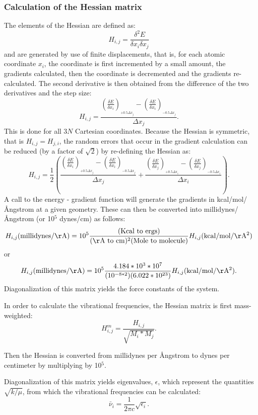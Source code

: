 \subsubsection*{Calculation of the Hessian matrix}
The elements of the Hessian are defined as:
$$
H_{i,j} = \frac{\delta^2E}{\delta x_i\delta x_j}
$$
and  are generated by use of finite displacements, that is, for each  atomic
coordinate $x_i$, the coordinate is first incremented by a small amount, the
gradients  calculated, then the coordinate is decremented and the gradients
re-calculated. The second derivative is then obtained from the difference of
the two derivatives and the step size:
$$
H_{i,j} = \frac{(\frac{\delta E}{\delta x_i})_{_{+0.5\Delta x_j}}-
                (\frac{\delta E}{\delta x_i})_{_{-0.5\Delta x_j}}}
          {\Delta x_j}.
$$
This is done for all $3N$ Cartesian coordinates.  Because the Hessian is
symmetric, that is $H_{i,j}=H_{j,i}$, the random errors that occur in the
gradient calculation can be reduced (by a factor of $\sqrt{2}$) by re-defining
the Hessian as:
$$
H_{i,j} = \frac{1}{2}\left(\frac{(\frac{\delta E}{\delta x_i})_{_{+0.5\Delta x_j}}-
                (\frac{\delta E}{\delta x_i})_{_{-0.5\Delta x_j}}}
          {\Delta x_j}+
 \frac{(\frac{\delta E}{\delta x_j})_{_{+0.5\Delta x_i}}-
                (\frac{\delta E}{\delta x_j})_{_{-0.5\Delta x_i}}}
          {\Delta x_i}\right).
$$
A call to the energy - gradient function  will generate the
gradients in kcal/mol/\AA ngstrom at a given geometry.  These can then be
converted into millidynes/\AA ngstrom (or 10$^5$ dynes/cm) as follows:
$$
H_{i,j} (\mathrm{millidynes/\AA}) = 10^5\frac{({\mathrm{Kcal\ to\
ergs}})}{(\mathrm{\AA\ to\ cm})^2(\mathrm{Mole\ to\ molecule})}H_{i,j}(\mathrm{kcal/mol/\AA ^2 })
$$
or
$$
H_{i,j} (\mathrm{millidynes/\AA}) = 10^5\frac{4.184*10^3*10^7}{(10^{-8*2})
(6.022*10^{23})}H_{i,j}(\mathrm{kcal/mol/\AA ^2}).
$$
Diagonalization of this matrix yields the force constants of the system.

In order to calculate the vibrational frequencies, the Hessian matrix is first
mass-weighted:
$$
H^m_{i,j} = \frac{H_{i,j}}{\sqrt{M_i*M_j}}.
$$

Then the Hessian is converted from millidynes per \AA ngstrom to dynes per
centimeter by multiplying by 10$^5$.

Diagonalization of this matrix yields eigenvalues, $\epsilon$, which represent
the quantities $\sqrt{k/\mu}$, from which the vibrational frequencies can be
calculated:
$$
\bar{\nu}_i = \frac{1}{2\pi c}\sqrt{\epsilon_i}.
$$

